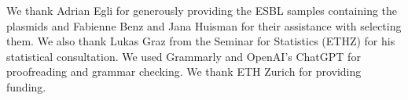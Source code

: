 We thank Adrian Egli for generously providing the ESBL samples containing the plasmids and Fabienne Benz and Jana Huisman for their assistance with selecting them.
We also thank Lukas Graz from the Seminar for Statistics (ETHZ) for his statistical consultation. 
We used Grammarly and OpenAI's ChatGPT for proofreading and grammar checking.
We thank ETH Zurich for providing funding.